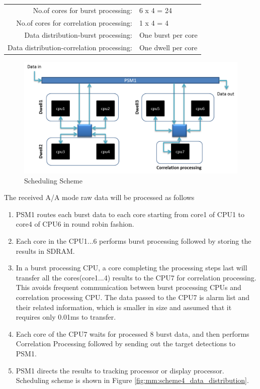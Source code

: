 \begin{tabular}{rl}
	No.of cores for burst processing: & 6 x 4 = 24 \\
	No.of cores for correlation processing: & 1 x 4 = 4 \\
	Data distribution-burst processing: & One burst per core \\
	Data distribution-correlation processing: & One dwell per core \\
\end{tabular}

\begin{figure}[h!]
	\centering
	\includegraphics[width=140mm]{figures/scheme4_aa_mode_mapping}
	\caption{Scheduling Scheme}
	\label{fig:mm:scheme4_aa_mode_mapping}
\end{figure}

\vspace*{0.2cm}
\noindent
The received A/A mode raw data will be processed as follows

\begin{enumerate}
\item PSM1 routes each burst data to each core starting from core1 of CPU1 to core4 of CPU6 in round robin fashion.
\item Each core in the CPU1...6 performs burst processing followed by storing the results in SDRAM.
\item In a burst processing CPU, a core completing the processing steps last will transfer all the cores(core1...4) results to the CPU7 for correlation processing. This avoids frequent communication between burst processing CPUs and correlation processing CPU. The data passed to the CPU7 is alarm list and their related information, which is smaller in size and assumed that it requires only 0.01ms to transfer.
\item Each core of the CPU7 waits for processed 8 burst data, and then performs Correlation Processing followed by sending out the target detections to PSM1.
\item PSM1 directs the results to tracking processor or display processor. Scheduling scheme is shown in Figure \ref{fig:mm:scheme4_data_distribution}.
\end{enumerate}

